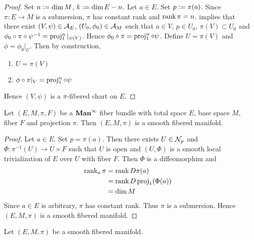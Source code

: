 \documentclass{book}
\begin{document}
\begin{proof}
	Set $n \vcentcolon= \dim M$, $k \vcentcolon= \dim E - n$. Let $a \in E$. Set $p \vcentcolon= \pi(a)$. Since $\pi:E \rightarrow M$ is a submersion, $\pi$ has constant rank and $\operatorname{\text{rank}} \pi = n$.  implies that there exist $(V, \psi) \in \mathcal{A}_E$, $(U_0, \phi_0) \in \mathcal{A}_M$ such that $a \in V$, $p \in U_0$, $\pi(V) \subset U_0$ and $\phi_0 \circ \pi \circ \psi^{-1} = \operatorname{\text{proj}}^n_1|_{\psi(V)}$. Hence $\phi_0 \circ \pi = \operatorname{\text{proj}}^n_1 \circ \psi $. Define $U = \pi(V)$ and $\phi = \phi_0|_U$. Then by construction, 
	\begin{enumerate}
		\item 
		$U = \pi(V)$
		\item 
		$\phi \circ \pi|_V = \operatorname{\text{proj}}_1^n \circ \psi$
	\end{enumerate}
	Hence $(V, \psi)$ is a $\pi$-fibered chart on $E$. 
\end{proof}


\begin{ex} 
	Let $(E, M, \pi, F)$ be a $\operatorname*{\text{\textbf{Man}}^{\infty}}$ fiber bundle with total space $E$, base space $M$, fiber $F$ and projection $\pi$. Then $(E, M, \pi)$ is a smooth fibered manifold. 
\end{ex}

\begin{proof}
	Let $a \in E$. Set $p = \pi(a)$. Then there exists $U \in \mathcal{N}_p$ and $\Phi:\pi^{-1}(U) \rightarrow U \times F$ such that $U$ is open and $(U, \Phi)$ is a smooth local trivialization of $E$ over $U$ with fiber $F$. Then $\Phi$ is a diffeomorphim and 
	\begin{align*}
		\operatorname{\text{rank}}_a \pi
		& = \operatorname{\text{rank}} D\pi(a) \\
		& = \operatorname{\text{rank}} D \operatorname{\text{proj}}_1(\Phi(a)) \\
		& = \dim M 
	\end{align*} 
	Since $a \in E$ is arbitrary, $\pi$ has constant rank. Thus $\pi$ is a submersion. Hence $(E, M, \pi)$ is a smooth fibered manifold.
\end{proof}



\begin{defn}
	Let $(E, M, \pi)$ be a smooth fibered manifold. 
\end{defn}

\begin{ex}
	
\end{ex}
\end{document}

